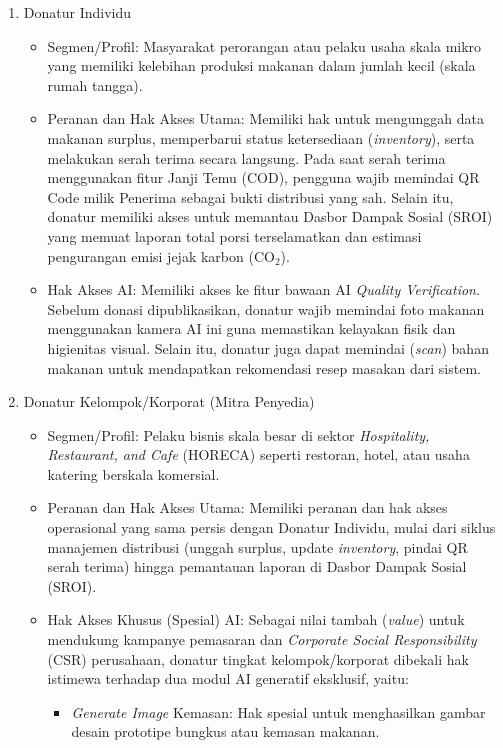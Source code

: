 \begin{enumerate}
    \item Donatur Individu
    \begin{itemize}
        \item Segmen/Profil: Masyarakat perorangan atau pelaku usaha skala mikro yang memiliki kelebihan produksi makanan dalam jumlah kecil (skala rumah tangga).
        \item Peranan dan Hak Akses Utama: Memiliki hak untuk mengunggah data makanan surplus, memperbarui status ketersediaan (\textit{inventory}), serta melakukan serah terima secara langsung. Pada saat serah terima menggunakan fitur Janji Temu (COD), pengguna wajib memindai QR Code milik Penerima sebagai bukti distribusi yang sah. Selain itu, donatur memiliki akses untuk memantau Dasbor Dampak Sosial (SROI) yang memuat laporan total porsi terselamatkan dan estimasi pengurangan emisi jejak karbon (CO$_2$).
        \item Hak Akses AI: Memiliki akses ke fitur bawaan AI \textit{Quality Verification}. Sebelum donasi dipublikasikan, donatur wajib memindai foto makanan menggunakan kamera AI ini guna memastikan kelayakan fisik dan higienitas visual. Selain itu, donatur juga dapat memindai (\textit{scan}) bahan makanan untuk mendapatkan rekomendasi resep masakan dari sistem.
    \end{itemize}
    \item Donatur Kelompok/Korporat (Mitra Penyedia)
    \begin{itemize}
        \item Segmen/Profil: Pelaku bisnis skala besar di sektor \textit{Hospitality, Restaurant, and Cafe} (HORECA) seperti restoran, hotel, atau usaha katering berskala komersial.
        \item Peranan dan Hak Akses Utama: Memiliki peranan dan hak akses operasional yang sama persis dengan Donatur Individu, mulai dari siklus manajemen distribusi (unggah surplus, update \textit{inventory}, pindai QR serah terima) hingga pemantauan laporan di Dasbor Dampak Sosial (SROI).
        \item Hak Akses Khusus (Spesial) AI: Sebagai nilai tambah (\textit{value}) untuk mendukung kampanye pemasaran dan \textit{Corporate Social Responsibility} (CSR) perusahaan, donatur tingkat kelompok/korporat dibekali hak istimewa terhadap dua modul AI generatif eksklusif, yaitu:
        \begin{itemize}
            \item \textit{Generate Image} Kemasan: Hak spesial untuk menghasilkan gambar desain prototipe bungkus atau kemasan makanan.

\end{itemize}
\end{itemize}
\end{enumerate}
